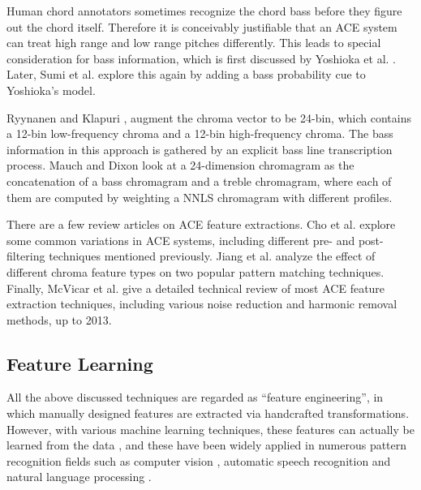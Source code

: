 Human chord annotators sometimes recognize the chord bass before they figure out the chord itself. Therefore it is conceivably justifiable that an ACE system can treat high range and low range pitches differently. This leads to special consideration for bass information, which is first discussed by Yoshioka et al. \cite{yoshioka2004automatic}. Later, Sumi et al. \cite{sumi2008automatic} explore this again by adding a bass probability cue to Yoshioka's model.

Ryynanen and Klapuri \cite{ryynanen2008automatic}, augment the chroma vector to be 24-bin, which contains a 12-bin low-frequency chroma and a 12-bin high-frequency chroma. The bass information in this approach is gathered by an explicit bass line transcription process. Mauch and Dixon \cite{mauch2010approximate,mauch2010simultaneous} look at a 24-dimension chromagram as the concatenation of a bass chromagram and a treble chromagram, where each of them are computed by weighting a NNLS chromagram with different profiles.

There are a few review articles on ACE feature extractions. Cho et al. \cite{cho2010exploring} explore some common variations in ACE systems, including different pre- and post-filtering techniques mentioned previously. Jiang et al. \cite{jiang2011analyzing} analyze the effect of different chroma feature types on two popular pattern matching techniques. Finally, McVicar et al. \cite{mcvicar2014automatic} give a detailed technical review of most ACE feature extraction techniques, including various noise reduction and harmonic removal methods, up to 2013.


\subsection{Feature Learning} \label{sec:2-fl}
All the above discussed techniques are regarded as ``feature engineering'', in which manually designed features are extracted via handcrafted transformations. However, with various machine learning techniques, these features can actually be learned from the data \cite{bengio2009learning}, and these have been widely applied in numerous pattern recognition fields such as computer vision \cite{hinton2006reducing}, automatic speech recognition and natural language processing \cite{deng2014deep}.

